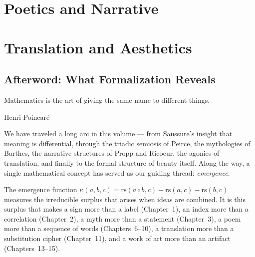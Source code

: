 \documentclass[11pt,oneside]{book}
\theoremstyle{plain}
\theoremstyle{definition}
\theoremstyle{remark}
\newcommand{\rs}{\mathrm{rs}}
\newcommand{\emerge}{\kappa}
\newcommand{\compose}{\circ}
\begin{document}


\part{Poetics and Narrative}
\label{part:poetics}



\part{Translation and Aesthetics}
\label{part:translation}



\backmatter

\chapter*{Afterword: What Formalization Reveals}

\epigraph{Mathematics is the art of giving the same name to different things.}{Henri Poincar\'{e}}

We have traveled a long arc in this volume --- from Saussure's insight that
meaning is differential, through the triadic semiosis of Peirce, the mythologies
of Barthes, the narrative structures of Propp and Ricoeur, the agonies of
translation, and finally to the formal structure of beauty itself. Along the
way, a single mathematical concept has served as our guiding thread:
\textit{emergence}.

The emergence function $\emerge(a, b, c) = \rs(a \compose b, c) - \rs(a, c) -
\rs(b, c)$ measures the irreducible surplus that arises when ideas are combined.
It is this surplus that makes a sign more than a label (Chapter~1), an index
more than a correlation (Chapter~2), a myth more than a statement (Chapter~3),
a poem more than a sequence of words (Chapters~6--10), a translation more than
a substitution cipher (Chapter~11), and a work of art more than an artifact
(Chapters~13--15).
\end{document}
